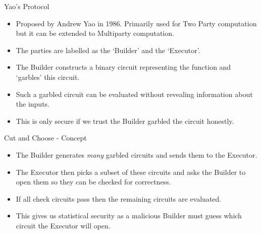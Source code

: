 \documentclass[t, 12pt]{beamer}            %
\begin{document}
\begin{frame}{Yao's Protocol}
	\begin{itemize} %
		\item Proposed by Andrew Yao in 1986. Primarily used for Two Party computation but it can be extended to Multiparty computation.
		\item The parties are labelled as the `Builder' and the `Executor'.
		\item The Builder constructs a binary circuit representing the function and `garbles' this circuit.
		\item Such a garbled circuit can be evaluated without revealing information about the inputs.
		\item This is only secure if we trust the Builder garbled the circuit honestly.
	\end{itemize}
\end{frame}


%	


\begin{frame}{Cut and Choose - Concept}
	\begin{itemize} %
		\item The Builder generates \emph{many} garbled circuits and sends them to the Executor.
		\item The Executor then picks a subset of these circuits and asks the Builder to open them so they can be checked for correctness.
		\item If all check circuits pass then the remaining circuits are evaluated.
		\item This gives us statistical security as a malicious Builder must guess which circuit the Executor will open.
	\end{itemize}
\end{frame}
\end{document}

